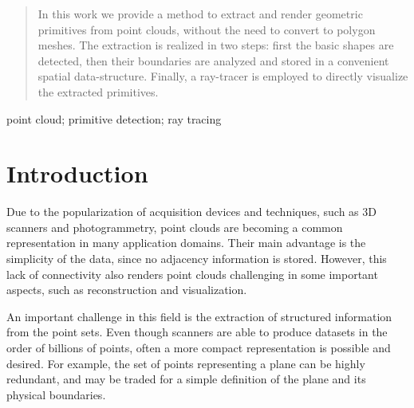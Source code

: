 \documentclass[10pt, conference]{IEEEtran}
\begin{document}
\maketitle

\begin{abstract}
In this work we provide a method to extract and render geometric primitives from point clouds, without the need to convert to polygon meshes. The extraction is realized in two steps: first the basic shapes are detected, then their boundaries are analyzed and stored in a convenient spatial data-structure. Finally, a ray-tracer is employed to directly visualize the extracted primitives.
\end{abstract}

\begin{IEEEkeywords}
  point cloud; primitive detection; ray tracing
\end{IEEEkeywords}

\IEEEpeerreviewmaketitle



\section{Introduction}
Due to the popularization of acquisition devices and techniques, such as 3D scanners and photogrammetry, point clouds are becoming a common representation in many application domains. Their main advantage is the simplicity of the data, since no adjacency information is stored. However, this lack of connectivity also renders point clouds challenging in some important aspects, such as reconstruction and visualization.

An important challenge in this field is the extraction of structured information from the point sets. Even though scanners are able to produce datasets in the order of billions of points, often a more compact representation is possible and desired. For example, the set of points representing a plane can be highly redundant, and may be traded for a simple definition of the plane and its physical boundaries.
\end{document}
